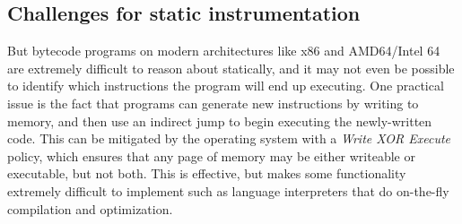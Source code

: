 \documentclass[11pt,twoside]{scrartcl}
\begin{document}
\subsection{Challenges for static instrumentation}
But bytecode programs on modern architectures like x86 and AMD64/Intel 64 are extremely difficult to reason about statically, and it may not even be possible to identify which instructions the program will end up executing. One practical issue is the fact that programs can generate new instructions by writing to memory, and then use an indirect jump to begin executing the newly-written code. This can be mitigated by the operating system with a \emph{Write XOR Execute} policy, which ensures that any page of memory may be either writeable or executable, but not both. This is effective, but makes some functionality extremely difficult to implement such as language interpreters that do on-the-fly compilation and optimization.
\end{document}
